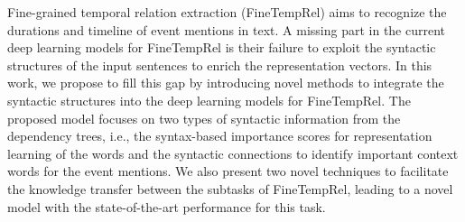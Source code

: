 Fine-grained temporal relation extraction (FineTempRel) aims to recognize the durations and timeline of event mentions in text. A missing part in the current deep learning models for FineTempRel is their failure to exploit the syntactic structures of the input sentences to enrich the representation vectors. In this work, we propose to fill this gap by introducing novel methods to integrate the syntactic structures into the deep learning models for FineTempRel. The proposed model focuses on two types of syntactic information from the dependency trees, i.e., the syntax-based importance scores for representation learning of the words and the syntactic connections to identify important context words for the event mentions. We also present two novel techniques to facilitate the knowledge transfer between the subtasks of FineTempRel, leading to a novel model with the state-of-the-art performance for this task.
